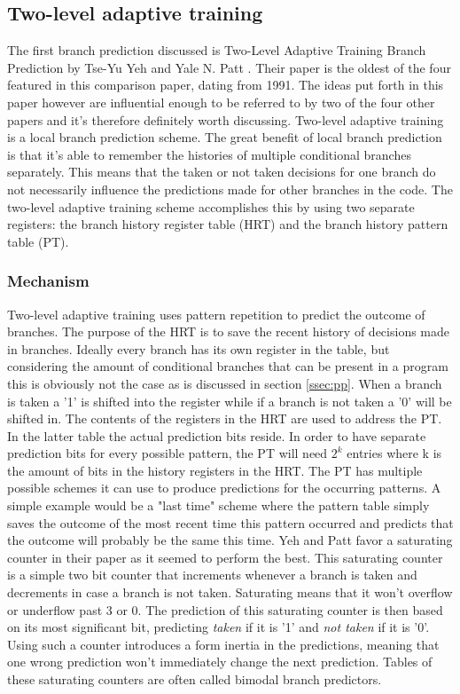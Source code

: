 \subsection{Two-level adaptive training}
\label{two-level}
The first branch prediction discussed is Two-Level Adaptive Training Branch Prediction by Tse-Yu Yeh and Yale N.
Patt \cite{twolevel}.
Their paper is the oldest of the four featured in this comparison paper, dating from 1991. The ideas put forth in this paper however are influential enough to be referred to by two of the four other papers and it's therefore definitely worth discussing.
Two-level adaptive training is a local branch prediction scheme.
The great benefit of local branch prediction is that it's able to remember the histories of multiple conditional branches separately.
This means that the taken or not taken decisions for one branch do not necessarily influence the predictions made for other branches in the code.
The two-level adaptive training scheme accomplishes this by using two separate registers: the branch history register table (HRT) and the branch history pattern table (PT).
\subsubsection{Mechanism}
Two-level adaptive training uses pattern repetition to predict the outcome of branches.
The purpose of the HRT is to save the recent history of decisions made in branches.
Ideally every branch has its own register in the table, but considering the amount of conditional branches that can be present in a program this is obviously not the case as is discussed in section \ref{ssec:pp}.
When a branch is taken a '1' is shifted into the register while if a branch is not taken a '0' will be shifted in.
The contents of the registers in the HRT are used to address the PT.
In the latter table the actual prediction bits reside.
In order to have separate prediction bits for every possible pattern, the PT will need $2^k$ entries where k is the amount of bits in the history registers in the HRT.
The PT has multiple possible schemes it can use to produce predictions for the occurring patterns.
A simple example would be a "last time" scheme where the pattern table simply saves the outcome of the most recent time this pattern occurred and predicts that the outcome will probably be the same this time.
Yeh and Patt favor a saturating counter in their paper as it seemed to perform the best.
This saturating counter is a simple two bit counter that increments whenever a branch is taken and decrements in case a branch is not taken.
Saturating means that it won't overflow or underflow past 3 or 0.
The prediction of this saturating counter is then based on its most significant bit, predicting \textit{taken} if it is '1' and \textit{not taken} if it is '0'.
Using such a counter introduces a form inertia in the predictions, meaning that one wrong prediction won't immediately change the next prediction.
Tables of these saturating counters are often called bimodal branch predictors.

